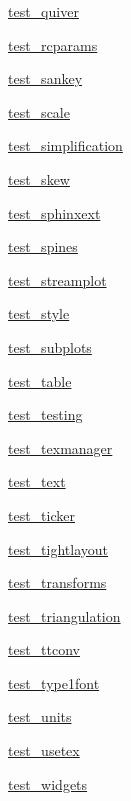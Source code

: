 \begin{DoxyCompactItemize}
\item 
 \hyperlink{namespacematplotlib_1_1tests_1_1test__quiver}{test\+\_\+quiver}
\item 
 \hyperlink{namespacematplotlib_1_1tests_1_1test__rcparams}{test\+\_\+rcparams}
\item 
 \hyperlink{namespacematplotlib_1_1tests_1_1test__sankey}{test\+\_\+sankey}
\item 
 \hyperlink{namespacematplotlib_1_1tests_1_1test__scale}{test\+\_\+scale}
\item 
 \hyperlink{namespacematplotlib_1_1tests_1_1test__simplification}{test\+\_\+simplification}
\item 
 \hyperlink{namespacematplotlib_1_1tests_1_1test__skew}{test\+\_\+skew}
\item 
 \hyperlink{namespacematplotlib_1_1tests_1_1test__sphinxext}{test\+\_\+sphinxext}
\item 
 \hyperlink{namespacematplotlib_1_1tests_1_1test__spines}{test\+\_\+spines}
\item 
 \hyperlink{namespacematplotlib_1_1tests_1_1test__streamplot}{test\+\_\+streamplot}
\item 
 \hyperlink{namespacematplotlib_1_1tests_1_1test__style}{test\+\_\+style}
\item 
 \hyperlink{namespacematplotlib_1_1tests_1_1test__subplots}{test\+\_\+subplots}
\item 
 \hyperlink{namespacematplotlib_1_1tests_1_1test__table}{test\+\_\+table}
\item 
 \hyperlink{namespacematplotlib_1_1tests_1_1test__testing}{test\+\_\+testing}
\item 
 \hyperlink{namespacematplotlib_1_1tests_1_1test__texmanager}{test\+\_\+texmanager}
\item 
 \hyperlink{namespacematplotlib_1_1tests_1_1test__text}{test\+\_\+text}
\item 
 \hyperlink{namespacematplotlib_1_1tests_1_1test__ticker}{test\+\_\+ticker}
\item 
 \hyperlink{namespacematplotlib_1_1tests_1_1test__tightlayout}{test\+\_\+tightlayout}
\item 
 \hyperlink{namespacematplotlib_1_1tests_1_1test__transforms}{test\+\_\+transforms}
\item 
 \hyperlink{namespacematplotlib_1_1tests_1_1test__triangulation}{test\+\_\+triangulation}
\item 
 \hyperlink{namespacematplotlib_1_1tests_1_1test__ttconv}{test\+\_\+ttconv}
\item 
 \hyperlink{namespacematplotlib_1_1tests_1_1test__type1font}{test\+\_\+type1font}
\item 
 \hyperlink{namespacematplotlib_1_1tests_1_1test__units}{test\+\_\+units}
\item 
 \hyperlink{namespacematplotlib_1_1tests_1_1test__usetex}{test\+\_\+usetex}
\item 
 \hyperlink{namespacematplotlib_1_1tests_1_1test__widgets}{test\+\_\+widgets}
\end{DoxyCompactItemize}
